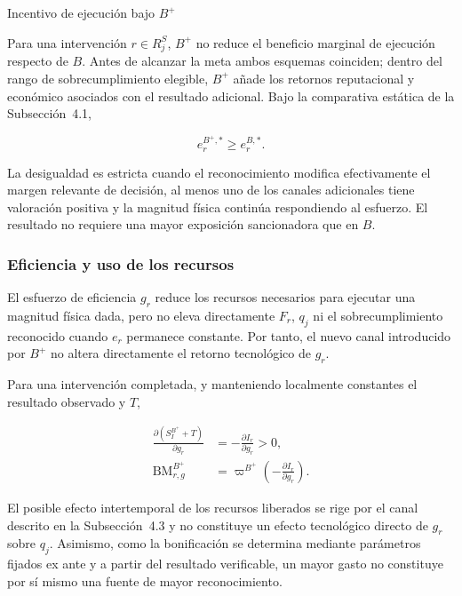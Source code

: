 \begin{resultadobox}
{Incentivo de ejecución bajo \(B^{+}\)}
\label{res:incentivo_ejecucion_bplus}

Para una intervención \(r\in R_j^{S}\), \(B^{+}\) no reduce el beneficio marginal de ejecución respecto de \(B\). Antes de alcanzar la meta ambos esquemas coinciden; dentro del rango de sobrecumplimiento elegible, \(B^{+}\) añade los retornos reputacional y económico asociados con el resultado adicional. Bajo la comparativa estática de la Subsección~4.1,

\begin{equation}
e_r^{B^{+},*}
\geq
e_r^{B,*}.
\end{equation}

La desigualdad es estricta cuando el reconocimiento modifica efectivamente el margen relevante de decisión, al menos uno de los canales adicionales tiene valoración positiva y la magnitud física continúa respondiendo al esfuerzo. El resultado no requiere una mayor exposición sancionadora que en \(B\).
\end{resultadobox}

\subsubsection{Eficiencia y uso de los recursos}

El esfuerzo de eficiencia \(g_r\) reduce los recursos necesarios para ejecutar una magnitud física dada, pero no eleva directamente \(F_r\), \(q_j\) ni el sobrecumplimiento reconocido cuando \(e_r\) permanece constante. Por tanto, el nuevo canal introducido por \(B^{+}\) no altera directamente el retorno tecnológico de \(g_r\).

Para una intervención completada, y manteniendo localmente constantes el resultado observado y \(T\),

\begin{equation}
\label{eq:incentivo_eficiencia_bplus}
\begin{aligned}
\frac{\partial (S_I^{B^{+}}+T)}{\partial g_r}
&=
-
\frac{\partial I_r}{\partial g_r}
>0,
\\
\mathrm{BM}_{r,g}^{B^{+}}
&=
\varpi^{B^{+}}
\left(
-
\frac{\partial I_r}{\partial g_r}
\right).
\end{aligned}
\end{equation}

El posible efecto intertemporal de los recursos liberados se rige por el canal descrito en la Subsección~4.3 y no constituye un efecto tecnológico directo de \(g_r\) sobre \(q_j\). Asimismo, como la bonificación se determina mediante parámetros fijados ex ante y a partir del resultado verificable, un mayor gasto no constituye por sí mismo una fuente de mayor reconocimiento.

